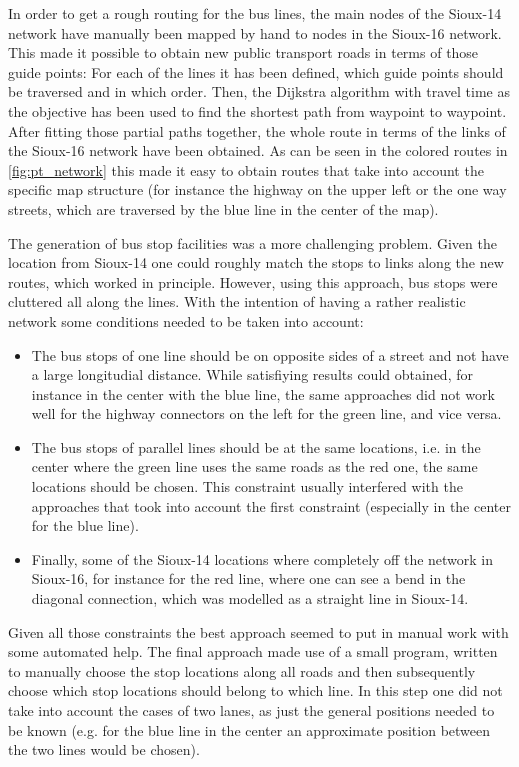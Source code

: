 In order to get a rough routing for the bus lines, the main nodes of the Sioux-14
network have manually been mapped by hand to nodes in the Sioux-16 network. This
made it possible to obtain new public transport roads in terms of those guide points:
For each of the lines it has been defined, which guide points should be traversed
and in which order. Then, the Dijkstra algorithm \citep{Dijkstra} with travel time as the objective
has been used to find the shortest path from waypoint to waypoint. After fitting
those partial paths together, the whole route in terms of the links of the Sioux-16
network have been obtained. As can be seen in the colored routes in \cref{fig:pt_network}
this made it easy to obtain routes that take into account the specific map structure
(for instance the highway on the upper left or the one way streets, which are
traversed by the blue line in the center of the map).

The generation of bus stop facilities was a more challenging problem. Given the
location from Sioux-14 one could roughly match the stops to links along the new
routes, which worked in principle. However, using this approach, bus stops were
cluttered all along the lines. With the intention of having a rather realistic
network some conditions needed to be taken into account:

\begin{itemize}
\item The bus stops of one line should be on opposite sides of a street and not
have a large longitudial distance. While satisfiying results could obtained, for
instance in the center with the blue line, the same approaches did not work well
for the highway connectors on the left for the green line, and vice versa.
\item The bus stops of parallel lines should be at the same locations, i.e. in
the center where the green line uses the same roads as the red one, the same
locations should be chosen. This constraint usually interfered with the approaches
that took into account the first constraint (especially in the center for the
blue line).
\item Finally, some of the Sioux-14 locations where completely off the network in Sioux-16,
for instance for the red line, where one can see a bend in the diagonal connection,
which was modelled as a straight line in Sioux-14.
\end{itemize}

Given all those constraints the best approach seemed to put in manual work with
some automated help. The final approach made use of a small program, written to
manually choose the stop locations along all roads and then subsequently choose
which stop locations should belong to which line. In this step one did not take
into account the cases of two lanes, as just the general positions needed to be
known (e.g. for the blue line in the center an approximate position between the
two lines would be chosen).

